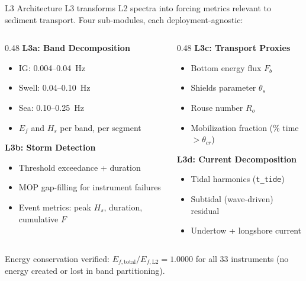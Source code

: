 \documentclass[10pt, aspectratio=169]{beamer}
\begin{document}
\begin{frame}{L3 Architecture}
  L3 transforms L2 spectra into forcing metrics relevant to sediment
  transport. Four sub-modules, each deployment-agnostic:
  \vspace{0.5em}
  \begin{columns}[T]
    \begin{column}{0.48\textwidth}
      \textbf{L3a: Band Decomposition}
      \begin{itemize}
        \item IG: 0.004--0.04~Hz
        \item Swell: 0.04--0.10~Hz
        \item Sea: 0.10--0.25~Hz
        \item $E_f$ and $H_s$ per band, per segment
      \end{itemize}
      \vspace{0.5em}
      \textbf{L3b: Storm Detection}
      \begin{itemize}
        \item Threshold exceedance + duration
        \item MOP gap-filling for instrument failures
        \item Event metrics: peak $H_s$, duration, cumulative $F$
      \end{itemize}
    \end{column}
    \begin{column}{0.48\textwidth}
      \textbf{L3c: Transport Proxies}
      \begin{itemize}
        \item Bottom energy flux $F_b$
        \item Shields parameter $\theta_s$
        \item Rouse number $R_o$
        \item Mobilization fraction (\% time $> \theta_{cr}$)
      \end{itemize}
      \vspace{0.5em}
      \textbf{L3d: Current Decomposition}
      \begin{itemize}
        \item Tidal harmonics (\texttt{t\_tide})
        \item Subtidal (wave-driven) residual
        \item Undertow + longshore current
      \end{itemize}
    \end{column}
  \end{columns}
  \vspace{0.5em}
  {\footnotesize Energy conservation verified:
  $E_{f,\text{total}} / E_{f,\text{L2}} = 1.0000$ for all 33
  instruments (no energy created or lost in band partitioning).}
\end{frame}
\end{document}
